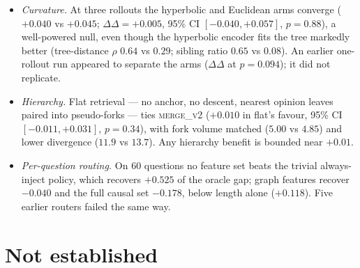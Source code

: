 \documentclass[11pt]{article}
\begin{document}
\begin{itemize}
  \item \emph{Curvature.} At three rollouts the hyperbolic and Euclidean arms
    converge ($+0.040$ vs $+0.045$; $\Delta\Delta = +0.005$, 95\% CI
    $[-0.040, +0.057]$, $p{=}0.88$), a well-powered null, even though the
    hyperbolic encoder fits the tree markedly better (tree-distance $\rho$ $0.64$
    vs $0.29$; sibling ratio $0.65$ vs $0.08$). An earlier one-rollout run
    appeared to separate the arms ($\Delta\Delta$ at $p{=}0.094$); it did not
    replicate.
  \item \emph{Hierarchy.} Flat retrieval --- no anchor, no descent, nearest
    opinion leaves paired into pseudo-forks --- ties \textsc{merge\_v2}
    ($+0.010$ in flat's favour, 95\% CI $[-0.011, +0.031]$, $p{=}0.34$), with
    fork volume matched ($5.00$ vs $4.85$) and lower divergence ($11.9$ vs
    $13.7$). Any hierarchy benefit is bounded near $+0.01$.
  \item \emph{Per-question routing.} On 60 questions no feature set beats the
    trivial always-inject policy, which recovers $+0.525$ of the oracle gap;
    graph features recover $-0.040$ and the full causal set $-0.178$, below
    length alone ($+0.118$). Five earlier routers failed the same way.
\end{itemize}

\section{Not established}
\end{document}
